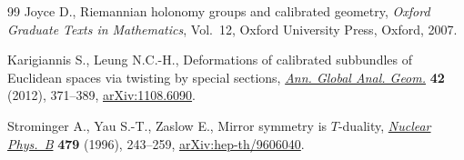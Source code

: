 \begin{thebibliography}{99}
Joyce D., Riemannian holonomy groups and calibrated geometry, \textit{Oxford
 Graduate Texts in Mathematics}, Vol.~12, Oxford University Press, Oxford,
 2007.

Karigiannis S., Leung N.C.-H., Deformations of calibrated subbundles of
 {E}uclidean spaces via twisting by special sections, \href{https://doi.org/10.1007/s10455-012-9317-1}{\textit{Ann. Global
 Anal. Geom.}} \textbf{42} (2012), 371--389, \href{https://arxiv.org/abs/1108.6090}{arXiv:1108.6090}.

Strominger A., Yau S.-T., Zaslow E., Mirror symmetry is {$T$}-duality,
 \href{https://doi.org/10.1016/0550-3213(96)00434-8}{\textit{Nuclear Phys.~B}} \textbf{479} (1996), 243--259,
 \href{https://arxiv.org/abs/hep-th/9606040}{arXiv:hep-th/9606040}.

\end{thebibliography}
